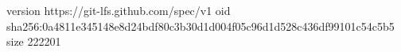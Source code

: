 version https://git-lfs.github.com/spec/v1
oid sha256:0a4811e345148e8d24bdf80c3b30d1d004f05c96d1d528c436df99101c54c5b5
size 222201

